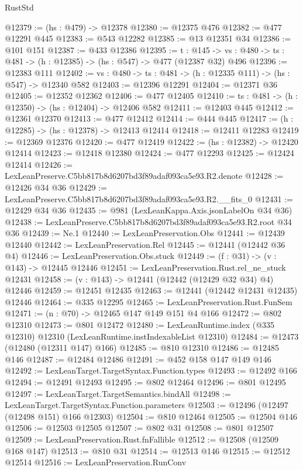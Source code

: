 \begin{lexlean}{RustStd}
\begin{coremodule}
@12379 := (hs : @479) -> @12378
@12380 := @12375 @476
@12382 := @477 @12291 @445
@12383 := @543 @12282
@12385 := @13 @12351 @34
@12386 := @101 @151
@12387 := @433 @12386
@12395 := {t : @145} ->
  {vs : @480} -> {ts : @481} -> (h : @12385) -> (hs : @547) -> @477 (@12387 @32) @496
@12396 := @12383 @111
@12402 := {vs : @480} -> {ts : @481} -> (h : @12335 @111) -> (hs : @547) -> @12340 @582
@12403 := @12396 @12291
@12404 := @12371 @36
@12405 := @12352 @12362
@12406 := @477 @12405
@12410 := {ts : @481} -> (h : @12350) -> (hs : @12404) -> @12406 @582
@12411 := @12403 @445
@12412 := @12361 @12370
@12413 := @477 @12412
@12414 := @444 @445
@12417 := (h : @12285) -> (hs : @12378) -> @12413 @12414
@12418 := @12411 @12283
@12419 := @12369 @12376
@12420 := @477 @12419
@12422 := (hs : @12382) -> @12420 @12414
@12423 := @12418 @12380
@12424 := @477 @12293
@12425 := @12424 @12414
@12426 := LexLeanPreserve.C5bb817b8d6207bd3f89adaf093ca5e93.R2.denote
@12428 := @12426 @34 @36
@12429 := LexLeanPreserve.C5bb817b8d6207bd3f89adaf093ca5e93.R2.__fits_0
@12431 := @12429 @34 @36
@12435 := @981 (LexLeanKappa.Axis.jsonLabelOn @34 @36)
@12438 := LexLeanPreserve.C5bb817b8d6207bd3f89adaf093ca5e93.R2.root @34 @36
@12439 := Ne.{1}
@12440 := LexLeanPreservation.Obs
@12441 := @12439 @12440
@12442 := LexLeanPreservation.Rel
@12445 := @12441 (@12442 @36 @4)
@12446 := LexLeanPreservation.Obs.stuck
@12449 := (f : @31) -> (v : @143) -> @12445 @12446
@12451 := LexLeanPreservation.Rust.rel_ne_stuck @12431
@12458 := (v : @143) -> @12441 (@12442 (@12429 @32 @34) @4) @12446
@12459 := @12451 @12435
@12463 := @12441 (@12442 @12431 @12435) @12446
@12464 := @335 @12295
@12465 := LexLeanPreservation.Rust.FunSem
@12471 := (n : @70) -> @12465 @147 @149 @151 @4 @166
@12472 := @802 @12310
@12473 := @801 @12472
@12480 := LexLeanRuntime.index (@335 @12310) @12310 (LexLeanRuntime.instIndexableList @12310)
@12484 := @12473 (@12480 (@12311 @147) @166)
@12485 := @810 @12310
@12486 := @12485 @146
@12487 := @12484 @12486
@12491 := @452 @158 @147 @149 @146
@12492 := LexLeanTarget.TargetSyntax.Function.types
@12493 := @12492 @166
@12494 := @12491 @12493
@12495 := @802 @12464
@12496 := @801 @12495
@12497 := LexLeanTarget.TargetSemantics.bindAll
@12498 := LexLeanTarget.TargetSyntax.Function.parameters
@12503 := @12496 (@12497 (@12498 @151) @166 @12303)
@12504 := @810 @12464
@12505 := @12504 @146
@12506 := @12503 @12505
@12507 := @802 @31
@12508 := @801 @12507
@12509 := LexLeanPreservation.Rust.fnFallible
@12512 := @12508 (@12509 @168 @147)
@12513 := @810 @31
@12514 := @12513 @146
@12515 := @12512 @12514
@12516 := LexLeanPreservation.RunConv

\end{coremodule}
\end{lexlean}
